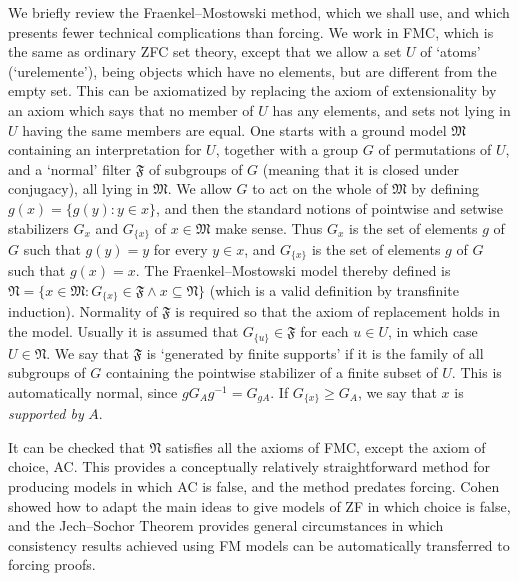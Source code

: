 \documentclass[a4paper,reqno]{amsart}
\numberwithin{equation}{section}
\begin{document}
We briefly review the Fraenkel--Mostowski method, which we shall use, and which presents fewer technical complications
than forcing. We work in FMC, which is the same as ordinary ZFC set theory, except that 
we allow a set $U$ of `atoms' (`urelemente'), being objects which have no elements, but are different from the empty set. 
This can be axiomatized by replacing the axiom of extensionality by an axiom which says that no member of $U$ has 
any elements, and sets not lying in $U$ having the same members are equal. One starts with a ground model
$\mathfrak M$ containing an interpretation for $U$, together with a group $G$ of permutations of $U$, and a `normal'
filter $\mathfrak F$ of subgroups of $G$ (meaning that it is closed under conjugacy), all lying in $\mathfrak M$. We allow 
$G$ to act on the whole of $\mathfrak M$ by defining $g(x) = \{g(y): y \in x\}$, and then the standard notions of 
pointwise and setwise stabilizers $G_x$ and $G_{\{x\}}$ of $x \in {\mathfrak M}$ make sense. Thus $G_x$ is the
set of elements $g$ of $G$ such that $g(y) = y$ for every $y \in x$, and $G_{\{x\}}$ is the set of elements $g$ of $G$ 
such that $g(x) = x$. The Fraenkel--Mostowski model thereby defined is 
${\mathfrak N} = \{x \in {\mathfrak M}: G_{\{x\}} \in {\mathfrak F} \wedge x \subseteq {\mathfrak N}\}$ (which is a valid 
definition by transfinite induction). Normality of $\mathfrak F$ is required so that the axiom of
replacement holds in the model. Usually it is assumed that $G_{\{u\}} \in {\mathfrak F}$ for each $u \in U$, in which 
case $U \in {\mathfrak N}$. We say that $\mathfrak F$ is `generated by finite supports' if it is the family of
all subgroups of $G$ containing the pointwise stabilizer of a finite subset of $U$. This is automatically normal,
since $gG_Ag^{-1} = G_{gA}$. If $G_{\{x\}} \ge G_A$, we say that $x$ is {\em supported by} $A$.

It can be checked that $\mathfrak N$ satisfies all the axioms of FMC, except the axiom
of choice, AC. This provides a conceptually relatively straightforward method for producing models in which AC
is false, and the method predates forcing. Cohen showed how to adapt the main ideas to give models of ZF in which
choice is false, and the Jech--Sochor Theorem \cite{Jech} provides general circumstances in which consistency results achieved
using FM models can be automatically transferred to forcing proofs.
\end{document}
